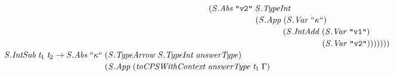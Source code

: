 \documentclass[10pt]{article}
\newcommand{\Conid}[1]{\mathit{#1}}
\newcommand{\Varid}[1]{\mathit{#1}}
\begin{document}
\begin{hscode}
${\hskip1.00em\relax\hskip1.00em\relax\phantom{\Conid{\Conid{S}.IntAdd}\;\Varid{t}_{1}\;\Varid{t}_{2}\to \Conid{\Conid{S}.Abs}\;\text{``}\kappa\text{``}\;\mbox{}}\phantom{(\Conid{\Conid{S}.App}\;\mbox{}}\phantom{(\Conid{\Conid{S}.Abs}\;\text{\tt \char34 v1\char34}\;\mbox{}}\phantom{(\Conid{\Conid{S}.App}\;\mbox{}}(\Conid{\Conid{S}.Abs}\;\text{\tt \char34 v2\char34}\;\Conid{\Conid{S}.TypeInt}\;}$\\
${\hskip1.00em\relax\hskip1.00em\relax\phantom{\Conid{\Conid{S}.IntAdd}\;\Varid{t}_{1}\;\Varid{t}_{2}\to \Conid{\Conid{S}.Abs}\;\text{``}\kappa\text{``}\;\mbox{}}\phantom{(\Conid{\Conid{S}.App}\;\mbox{}}\phantom{(\Conid{\Conid{S}.Abs}\;\text{\tt \char34 v1\char34}\;\mbox{}}\phantom{(\Conid{\Conid{S}.App}\;\mbox{}}\phantom{(\Conid{\Conid{S}.Abs}\;\text{\tt \char34 v2\char34}\;\mbox{}}(\Conid{\Conid{S}.App}\;(\Conid{\Conid{S}.Var}\;\text{``}\kappa\text{``})\;}$\\
${\hskip1.00em\relax\hskip1.00em\relax\phantom{\Conid{\Conid{S}.IntAdd}\;\Varid{t}_{1}\;\Varid{t}_{2}\to \Conid{\Conid{S}.Abs}\;\text{``}\kappa\text{``}\;\mbox{}}\phantom{(\Conid{\Conid{S}.App}\;\mbox{}}\phantom{(\Conid{\Conid{S}.Abs}\;\text{\tt \char34 v1\char34}\;\mbox{}}\phantom{(\Conid{\Conid{S}.App}\;\mbox{}}\phantom{(\Conid{\Conid{S}.Abs}\;\text{\tt \char34 v2\char34}\;\mbox{}}\phantom{(\Conid{\Conid{S}.App}\;\mbox{}}(\Conid{\Conid{S}.IntAdd}\;(\Conid{\Conid{S}.Var}\;\text{\tt \char34 v1\char34})\;}$\\
${\hskip1.00em\relax\hskip1.00em\relax\phantom{\Conid{\Conid{S}.IntAdd}\;\Varid{t}_{1}\;\Varid{t}_{2}\to \Conid{\Conid{S}.Abs}\;\text{``}\kappa\text{``}\;\mbox{}}\phantom{(\Conid{\Conid{S}.App}\;\mbox{}}\phantom{(\Conid{\Conid{S}.Abs}\;\text{\tt \char34 v1\char34}\;\mbox{}}\phantom{(\Conid{\Conid{S}.App}\;\mbox{}}\phantom{(\Conid{\Conid{S}.Abs}\;\text{\tt \char34 v2\char34}\;\mbox{}}\phantom{(\Conid{\Conid{S}.App}\;\mbox{}}\phantom{(\Conid{\Conid{S}.IntAdd}\;\mbox{}}(\Conid{\Conid{S}.Var}\;\text{\tt \char34 v2\char34})))))))}$\\
${\hskip1.00em\relax\hskip1.00em\relax\Conid{\Conid{S}.IntSub}\;\Varid{t}_{1}\;\Varid{t}_{2}\to \Conid{\Conid{S}.Abs}\;\text{``}\kappa\text{``}\;(\Conid{\Conid{S}.TypeArrow}\;\Conid{\Conid{S}.TypeInt}\;\Varid{answerType})\;}$\\
${\hskip1.00em\relax\hskip1.00em\relax\phantom{\Conid{\Conid{S}.IntSub}\;\Varid{t}_{1}\;\Varid{t}_{2}\to \Conid{\Conid{S}.Abs}\;\text{``}\kappa\text{``}\;\mbox{}}(\Conid{\Conid{S}.App}\;(\Varid{toCPSWithContext}\;\Varid{answerType}\;\Varid{t}_{1}\;\Gamma)\;}$\\

\end{hscode}
\end{document}

